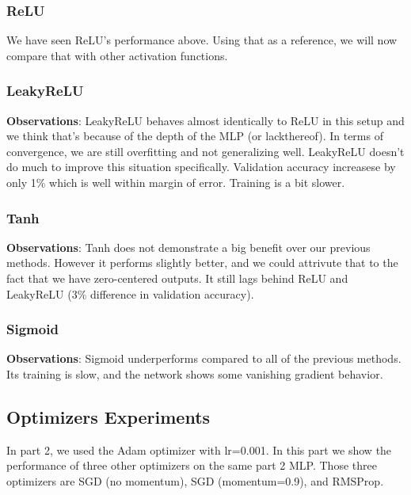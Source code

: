 \documentclass[12pt]{article}
\begin{document}
			\subsubsection{ReLU}
		We have seen ReLU's performance above. Using that as a reference, we will now compare that with other activation functions. 
	
	\subsubsection{LeakyReLU}
	
	
	\textbf{Observations}: LeakyReLU behaves almost identically to ReLU in this setup and we think that's because of the depth of the MLP (or lackthereof). In terms of convergence, we are still overfitting and not generalizing well. LeakyReLU doesn't do much to improve this situation specifically. Validation accuracy increasese by only 1\% which is well within margin of error. Training is a bit slower.
	
	\subsubsection{Tanh}
	
		\textbf{Observations}: Tanh does not demonstrate a big benefit over our previous methods. However it performs slightly better, and we could attrivute that to the fact that we have zero-centered outputs. It still lags behind ReLU and LeakyReLU (3\% difference in validation accuracy).
	
	\subsubsection{Sigmoid}
	
		\vspace{10pt}
		\textbf{Observations}: Sigmoid underperforms compared to all of the previous methods. Its training is slow, and the network shows some vanishing gradient behavior.
		\\
	
		
		
		\subsection{Optimizers Experiments}
		In part 2, we used the Adam optimizer with lr=0.001. In this part we show the performance of three other optimizers on the same part 2 MLP. Those three optimizers are SGD (no momentum), SGD (momentum=0.9), and RMSProp.
	
\end{document}
